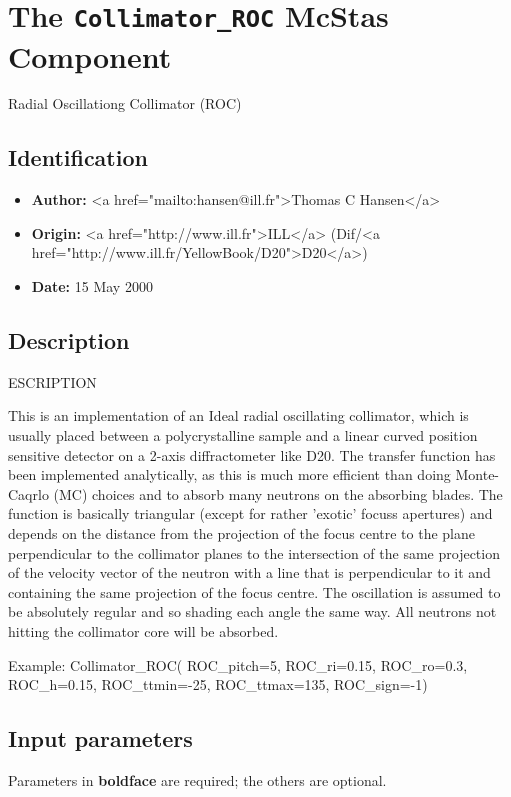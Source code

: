\section{The \texttt{Collimator\_ROC} McStas Component}
Radial Oscillationg Collimator (ROC)

\subsection*{Identification}
\begin{itemize}
  \item \textbf{Author:} \textless{}a href="mailto:hansen@ill.fr"\textgreater{}Thomas C Hansen\textless{}/a\textgreater{}
  \item \textbf{Origin:} \textless{}a href="http://www.ill.fr"\textgreater{}ILL\textless{}/a\textgreater{} (Dif/\textless{}a href="http://www.ill.fr/YellowBook/D20"\textgreater{}D20\textless{}/a\textgreater{})
  \item \textbf{Date:} 15 May 2000
\end{itemize}

\subsection*{Description}
ESCRIPTION

This is an implementation of an Ideal radial oscillating collimator, which is usually placed between a polycrystalline sample and a linear curved position sensitive detector on a 2-axis diffractometer like D20. The transfer function has been implemented analytically, as this is much more efficient than doing Monte-Caqrlo (MC) choices and to absorb many neutrons on the absorbing blades. The function is basically triangular (except for rather 'exotic' focuss apertures) and depends on the distance from the projection of the focus centre to the plane perpendicular to the collimator planes to the intersection of the same projection of the velocity vector of the neutron with a line that is perpendicular to it and containing the same projection of the focus centre. The oscillation is assumed to be absolutely regular and so shading each angle the same way. All neutrons not hitting the collimator core will be absorbed.

Example: Collimator\_ROC( ROC\_pitch=5, ROC\_ri=0.15, ROC\_ro=0.3, ROC\_h=0.15, ROC\_ttmin=-25, ROC\_ttmax=135, ROC\_sign=-1)

\subsection*{Input parameters}
Parameters in \textbf{boldface} are required; the others are optional.

